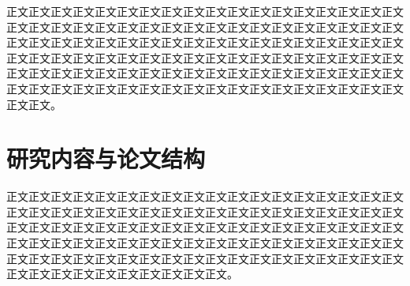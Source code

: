 正文正文正文正文正文正文正文正文正文正文正文正文正文正文正文正文正文正文正文正文正文正文正文正文正文正文正文正文正文正文正文正文正文正文正文正文正文正文正文正文正文正文正文正文正文正文正文正文正文正文正文正文正文正文正文正文正文正文正文正文正文正文正文正文正文正文正文正文正文正文正文正文正文正文正文正文正文正文正文正文正文正文正文正文正文正文正文正文正文正文正文正文正文正文正文正文正文正文正文正文正文正文正文正文正文正文正文正文正文正文。

\section{研究内容与论文结构}
正文正文正文正文正文正文正文正文正文正文正文正文正文正文正文正文正文正文正文正文正文正文正文正文正文正文正文正文正文正文正文正文正文正文正文正文正文正文正文正文正文正文正文正文正文正文正文正文正文正文正文正文正文正文正文正文正文正文正文正文正文正文正文正文正文正文正文正文正文正文正文正文正文正文正文正文正文正文正文正文正文正文正文正文正文正文正文正文正文正文正文正文正文正文正文正文正文正文正文正文。

